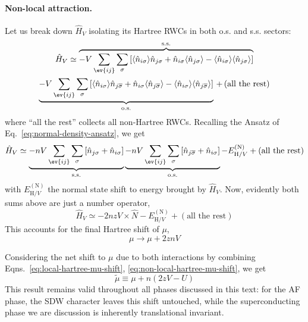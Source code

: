 \paragraph{Non-local attraction.}

Let us break down $\hat H_V$ isolating its Hartree RWCs in both o.s. and s.s. sectors:
\begin{multline}
	\hat H_V \simeq 
	\overbrace{
		-V \sum_{\ev{ij}} \sum_\sigma \left[
			\langle 
			\hat n_{i\sigma}
			\rangle \hat n_{j\sigma} + \hat n_{i\sigma} \langle 
			\hat n_{j\sigma}
			\rangle - \langle 
			\hat n_{i\sigma}
			\rangle \langle 
			\hat n_{j\sigma}
			\rangle
		\right]
	}^{\mathrm{s.s.}} \\
	\underbrace{
		-V \sum_{\ev{ij}} \sum_\sigma \left[
			\langle
			\hat n_{i\sigma}
			\rangle \hat n_{j\overline{\sigma}} + \hat n_{i\sigma} \langle 
			\hat n_{j\overline{\sigma}}
			\rangle
			- \langle 
			\hat n_{i\sigma}
			\rangle \langle 
			\hat n_{j\overline{\sigma}}
			\rangle
		\right]
	}_{\mathrm{o.s.}} \, +\, 
	(\text{all the rest})
	\label{eq:normal-V-wick-decomposition}
\end{multline}
where ``all the rest'' collects all non-Hartree RWCs. Recalling the Ansatz of Eq.~\eqref{eq:normal-density-ansatz}, we get
\[
	\hat H_V \simeq  \underbrace{
		-nV \sum_{\ev{ij}} \sum_\sigma \left[
		\hat n_{j\sigma} + \hat n_{i\sigma}
		\right]
	}_{\mathrm{s.s.}}
	\underbrace{
		-nV \sum_{\ev{ij}} \sum_\sigma \left[
		\hat n_{j\overline{\sigma}} + \hat n_{i\sigma}
		\right]
	}_{\mathrm{o.s.}} 
	- E_{\mathrm{H}/V}^{(\mathrm{N})}
	+ (\text{all the rest})
\]
with $E_{\mathrm{H}/V}^{(\mathrm{N})}$ the normal state shift to energy brought by $\hat H_V$. Now, evidently both sums above are just a number operator,
\[
	\hat H_V \simeq -2nzV \times \hat N - E_{\mathrm{H}/V}^{(\mathrm{N})} + 
	(\text{all the rest})
\]
This accounts for the final Hartree shift of $\mu$,
\begin{equation}\label{eq:non-local-hartree-mu-shift}
	\mu \to \mu + 2znV
\end{equation}

Considering the net shift to $\mu$ due to both interactions by combining Eqns.~\eqref{eq:local-hartree-mu-shift}, \eqref{eq:non-local-hartree-mu-shift}, we get
\begin{equation}\label{eq:total-hartree-mu-shift}
	\tilde{\mu} \equiv \mu + n(2zV-U)
\end{equation}
This result remains valid throughout all phases discussed in this text: for the AF phase, the SDW character leaves this shift untouched, while the superconducting phase we are discussion is inherently translational invariant.

